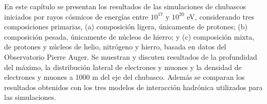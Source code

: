 En este capítulo se presentan los resultados de las simulaciones de chubascos iniciados por rayos cósmicos de energías entre $10^{17}$ y $10^{20}$ eV, considerando tres composiciones primarias, (a) composición ligera, únicamente de protones; (b) composición pesada, únicamente de núcleos de hierro; y (c) composición mixta, de protones y núcleos de helio, nitrógeno y hierro, basada en datos del Observatorio Pierre Auger. Se muestran y discuten resultados de la profundidad del máximo, la distribución lateral de electrones y muones y la densidad de electrones y muones a 1000 m del eje del chubasco. Además se comparan los resultados obtenidos con los tres modelos de interacción hadrónica utilizados para las simulaciones. \\


%
%
%
